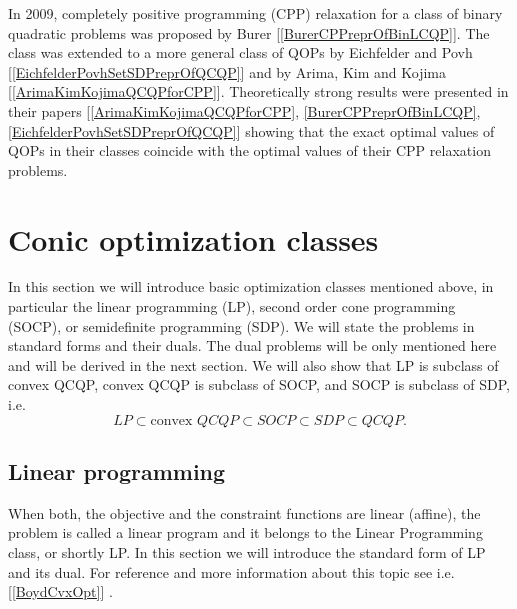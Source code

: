 \documentclass[12pt]{book}
\theoremstyle{definition}
\begin{document}
In 	2009, completely positive programming (CPP) relaxation for a class of binary quadratic problems was proposed
by Burer [\ref{BurerCPPreprOfBinLCQP}]. 
The class was extended to a more general class of QOPs by Eichfelder and
Povh [\ref{EichfelderPovhSetSDPreprOfQCQP}] and by Arima, Kim and Kojima [\ref{ArimaKimKojimaQCQPforCPP}]. Theoretically strong results were presented in
their papers [\ref{ArimaKimKojimaQCQPforCPP}, \ref{BurerCPPreprOfBinLCQP}, \ref{EichfelderPovhSetSDPreprOfQCQP}] showing that the exact optimal values of QOPs in their classes coincide
with the optimal values of their CPP relaxation problems.










\chapter{Conic optimization classes}
\label{ConicOptClasses}

In this section we will introduce basic optimization classes mentioned above, in particular the  linear programming (LP), second order cone programming  (SOCP), or semidefinite programming (SDP). We will state the problems in standard forms and their duals. The dual problems will be only mentioned here and will be derived in the next section. We will also show that LP is subclass of convex QCQP, convex QCQP is subclass of SOCP, and SOCP is subclass of SDP, i.e.
\begin{equation}
LP\subset \mbox{convex } QCQP \subset SOCP \subset SDP \subset QCQP .
\end{equation}












\section{Linear programming}

When both, the objective and the constraint functions are linear (affine), the problem is called a linear program and it belongs to the Linear Programming class, or shortly LP.
In this section we will introduce the standard form of LP and its dual. For reference and more information about this topic see i.e. [\ref{BoydCvxOpt}] .
\end{document}
